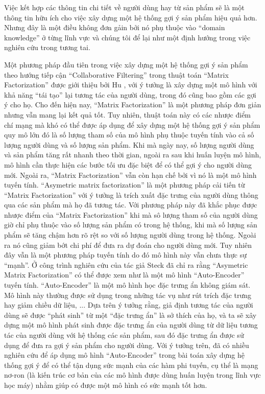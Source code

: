 Việc kết hợp các thông tin chi tiết về người dùng hay từ sản phẩm sẽ là một thông tin hữu ích cho việc xây dựng một hệ thống gợi ý sản phẩm hiệu quả hơn. Nhưng đây là một điều không đơn gảin bởi nó phụ thuộc vào ``domain knowledge'' ở từng lĩnh vực và chúng tôi để lại như một định hướng trong việc nghiên cứu trong tương tai.

Một phương pháp đầu tiên trong việc xây dựng một hệ thống gợi ý sản phẩm theo hướng tiếp cận ``Collaborative Filtering'' trong thuật toán ``Matrix Factorization'' được giới thiệu bởi Hu \cite{MF}, với ý tưởng là xây dựng một mô hình với khả năng ``tái tạo'' lại tương tác của người dùng, trong đó cũng bao gồm các gợi ý cho họ.
Cho đến hiện nay, ``Matrix Factorization'' là một phương pháp đơn giản nhưng vẫn mang lại kết quả tốt.
Tuy nhiên, thuật toán này có các nhược điểm chí mạng mà khó có thể được áp dụng để xây dựng một hệ thống gợi ý sản phẩm quy mô lớn đó là số lượng tham số của mô hình phụ thuộc tuyến tính vào cả số lượng người dùng và số lượng sản phẩm.
Khi mà ngày nay, số lượng người dùng và sản phẩm tăng rất nhanh theo thời gian, ngoài ra sau khi huấn luyện mô hình, mô hình cần thực hiện các bước tối ưu đặc biệt để có thể gợi ý cho người dùng mới. 
Ngoài ra, ``Matrix Factorization'' vẫn còn hạn chế bởi vì nó là một mô hình tuyến tính.
``Asymetric matrix factorization'' là một phương pháp cải tiến từ ``Matrix Factorization'' với ý tưởng là trích xuất đặc trưng của người dùng thông qua các sản phẩm mà họ đã tương tác. Với phương pháp này đã khắc phục được nhược điểm của ``Matrix Factorization'' khi mà sô lượng tham số của người dùng giờ chỉ phụ thuộc vào số lượng sản phẩm có trong hệ thống, khi mà số lượng sản phẩm sẽ tăng chậm hơn rõ rệt so với số lượng người dùng trong hệ thống. Ngoài ra nó cũng giảm bớt chi phí để đưa ra dự đoán cho người dùng mới. Tuy nhiên đây vẫn là một phương pháp tuyến tính do đó mô hình này vẫn chưa thực sự ``mạnh''.
Ở công trình nghiên cứu \cite{AMF} của tác giả Steck đã chỉ ra rằng ``Asymetric Matrix Factorization'' có thể được xem như là một mô hình ``Auto-Encoder'' tuyến tính. ``Auto-Encoder'' là một mô hình học đặc trưng ẩn không giám sát. Mô hình này thường được sử dụng trong những tác vụ như rút trích đặc trưng hay giảm chiều dữ liệu, ... Dựa trên ý tưởng rằng, giả định tương tác của người dùng sẽ được ``phát sinh'' từ một ``đặc trưng ẩn'' là sở thích của họ, và ta sẽ xây dựng một mô hình phát sinh được đặc trưng ẩn của người dùng từ dữ liệu tương tác của người dùng với hệ thống các sản phẩm, sau đó đặc trưng ẩn được sử dụng để đưa ra gợi ý sản phẩm cho người dùng. Với ý tưởng trên, đã có nhiều nghiên cứu để áp dụng mô hình ``Auto-Encoder'' trong bài toán xây dựng hệ thống gợi ý \cite{autorec,cdae,mvae} để có thể tận dụng sức mạnh của các hàm phi tuyến, cụ thể là mạng nơ-ron (là kiến trúc cơ bản của các mô hình được dùng huấn luyện trong lĩnh vực học máy) nhằm giúp có được một mô hình có sức mạnh tốt hơn.

